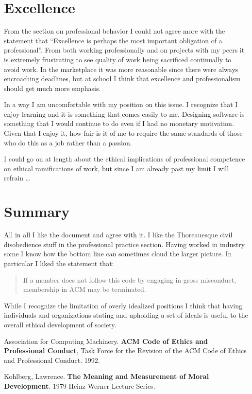\documentclass[12pt,a4paper,twoside]{article}  %
\begin{document}
\section{Excellence}
From the section on professional behavior I could not agree more with
the statement that ``Excellence is perhaps the most important
obligation of a professional''. From both working professionally and
on projects with my peers it is extremely frustrating to see quality
of work being sacrificed continually to avoid work. In the marketplace
it was more reasonable since there were always encroaching deadlines,
but at school I think that excellence and professionalism should get
much more emphasis.

In a way I am uncomfortable with my position on this issue. I
recognize that I enjoy learning and it is something that comes easily
to me. Designing software is something that I would continue to do
even if I had no monetary motivation. Given that I enjoy it, how fair
is it of me to require the same standards of those who do this as a
job rather than a passion.

I could go on at length about the ethical implications of professional
competence on ethical ramifications of work, but since I am already
past my limit I will refrain \ldots

\section{Summary}
All in all I like the document and agree with it. I like the
Thoreauesque civil disobedience stuff in the professional practice
section. Having worked in industry some I know how the bottom line can
sometimes cloud the larger picture. In particular I liked the
statement that:
\begin{quote}
If a member does not follow this code by engaging in gross misconduct,
membership in ACM may be terminated.
\end{quote}

While I recognize the limitation of overly idealized positions I
think that having individuals and organizations stating and upholding
a set of ideals is useful to the overall ethical development of society.

\begin{thebibliography}{99}
 Association for Computing Machinery. {\bf ACM Code of
Ethics and Professional Conduct}, Task Force for the Revision of the
ACM Code of Ethics and Professional Conduct. 1992.

Kohlberg, Lawrence. {\bf The Meaning and Measurement
of Moral Development}. 1979 Heinz Werner Lecture Series.
\end{thebibliography}
\end{document}
